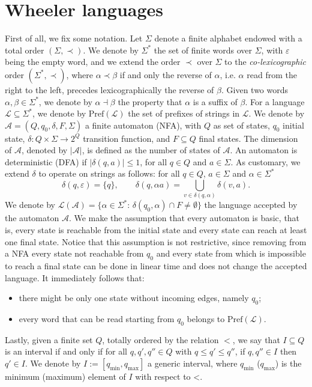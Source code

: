 \documentclass[runningheads]{llncs}
\newcommand{\pf}[1]{\text{Pref}(\mathcal #1)}
\newcommand{\la}[1]{\mathcal L(\mathcal #1)}
\begin{document}
\section{Wheeler languages}
First of all, we fix some notation. Let $\Sigma$ denote a finite alphabet endowed with a total order $(\Sigma,\prec)$. We denote by $\Sigma^*$ the set of finite words over $\Sigma$, with $\varepsilon$ being the empty word, and we extend the order $\prec$ over $\Sigma$ to the \emph{co-lexicographic} order $(\Sigma^*, \prec)$, where $\alpha \prec \beta$ if and only the reverse of $\alpha$, i.e. $\alpha$ read from the right to the left, precedes lexicographically the reverse of $\beta$. Given two words $\alpha, \beta \in \Sigma^*$, we denote by $\alpha \dashv \beta$ the property that $\alpha$ is a suffix of $\beta$. 
For a language $\mathcal L \subseteq \Sigma^*$, we denote by $\pf L$ the set of prefixes of strings in $\mathcal L$.
We denote by $\mathcal A = (Q, q_0, \delta, F, \Sigma)$ a finite automaton (NFA), with $Q$ as set of states, $q_0$ initial state, $\delta: Q \times \Sigma \rightarrow 2^Q$ transition function, and $F \subseteq Q$ final states. 
The dimension of $\mathcal A$, denoted by $|\mathcal A|$, is defined as the number of states of $\mathcal{A}$.
An automaton is deterministic (DFA) if $|\delta(q, a)| \le 1$, for all $q\in Q$ and $a\in \Sigma$. As customary, we extend $\delta$ to operate on strings as follows: for all $q\in Q$, $a\in \Sigma$ and $\alpha \in \Sigma^*$
\[
\delta(q,\varepsilon) = \{q\}, \qquad \delta(q,\alpha a)=\bigcup_{v\in \delta(q,\alpha)} \delta(v,a). 
\]
We denote by $\la A = \{\alpha \in \Sigma^*:\, \delta(q_0,\alpha) \cap F \ne \emptyset\}$ the language accepted by the automaton $\mathcal A$.
We make the assumption that every automaton is basic, that is, every state is reachable from the initial state and every state can reach at least one final state. Notice that this assumption is not restrictive, since removing from a NFA every state not reachable from $q_0$ and every state from which is impossible to reach a final state can be done in linear time and does not change the accepted language.
It immediately follows that: 
\begin{itemize}
    \item there might be only one state without incoming edges, namely $q_0$; 
    \item every word that can be read starting from $q_0$ belongs to $\pf L$.
\end{itemize}
Lastly, given a finite set $Q$, totally ordered by the relation $<$, we say that $I \subseteq Q$ is an interval if and only if for all $q,q',q'' \in Q$ with $q\le q'\le q''$, if $q,q''\in I$ then $q' \in I$. We denote by $I:=[q_{\min}, q_{\max}]$ a generic interval, where $q_{\min}$ ($q_{\max}$) is the minimum (maximum) element of $I$ with respect to <.
\end{document}
